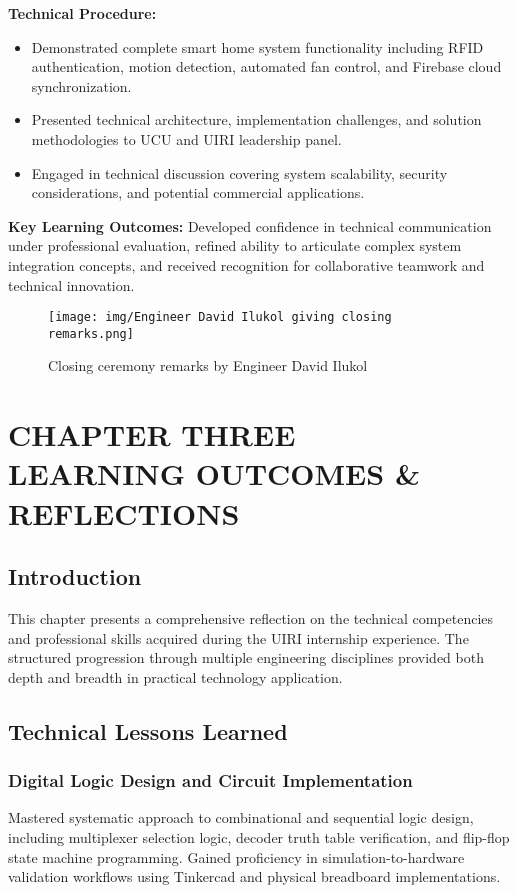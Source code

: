 \documentclass[12pt,a4paper]{report}
\begin{document}
\noindent\textbf{Technical Procedure:}
\begin{itemize}
    \item Demonstrated complete smart home system functionality including RFID authentication, motion detection, automated fan control, and Firebase cloud synchronization.
    \item Presented technical architecture, implementation challenges, and solution methodologies to UCU and UIRI leadership panel.
    \item Engaged in technical discussion covering system scalability, security considerations, and potential commercial applications.
\end{itemize}

\noindent\textbf{Key Learning Outcomes:} Developed confidence in technical communication under professional evaluation, refined ability to articulate complex system integration concepts, and received recognition for collaborative teamwork and technical innovation.

\begin{figure}[H]
\centering
\texttt{[image: img/Engineer David Ilukol giving closing remarks.png]}
\caption{Closing ceremony remarks by Engineer David Ilukol}
\label{fig:closing-remarks}
\end{figure}

\newpage
\chapter[CHAPTER THREE LEARNING OUTCOMES AND REFLECTIONS]{CHAPTER THREE \\LEARNING OUTCOMES \& REFLECTIONS}

\section{Introduction}

\noindent This chapter presents a comprehensive reflection on the technical competencies and professional skills acquired during the UIRI internship experience. The structured progression through multiple engineering disciplines provided both depth and breadth in practical technology application.

\section{Technical Lessons Learned}

\subsection{Digital Logic Design and Circuit Implementation}
\noindent Mastered systematic approach to combinational and sequential logic design, including multiplexer selection logic, decoder truth table verification, and flip-flop state machine programming. Gained proficiency in simulation-to-hardware validation workflows using Tinkercad and physical breadboard implementations.
\end{document}
